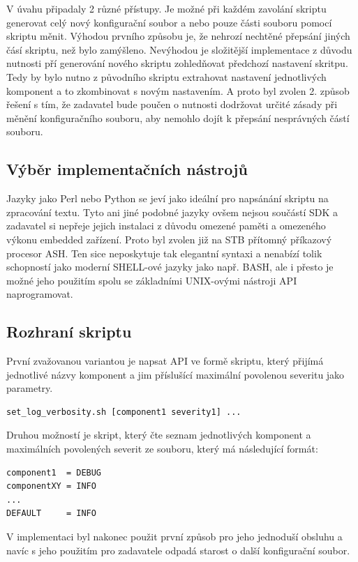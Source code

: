 \documentclass[thesis=B,czech]{FITthesis}[2012/06/26]
\begin{document}
V úvahu připadaly 2 různé přístupy. Je možné při každém zavolání skriptu generovat celý nový konfigurační soubor a nebo pouze části souboru pomocí skriptu měnit.
Výhodou prvního způsobu je, že nehrozí nechtěné přepsání jiných čásí skriptu, než bylo zamýšleno. Nevýhodou je složitější implementace z důvodu nutnosti pří generování nového skriptu zohledňovat předchozí nastavení skritpu. Tedy by bylo nutno z původního skriptu extrahovat nastavení jednotlivých komponent a to zkombinovat s novým nastavením.
A proto byl zvolen 2. způsob řešení s tím, že zadavatel bude poučen o nutnosti dodržovat určité zásady při měnění konfiguračního souboru, aby nemohlo dojít k přepsání nesprávných částí souboru.

\subsection{Výběr implementačních nástrojů}
Jazyky jako Perl nebo Python se jeví jako ideální pro napsánání skriptu na zpracování textu. Tyto ani jiné podobné jazyky ovšem nejsou součástí SDK a zadavatel si nepřeje jejich instalaci z důvodu omezené paměti a omezeného výkonu embedded zařízení. Proto byl zvolen již na STB přítomný příkazový procesor ASH. Ten sice neposkytuje tak elegantní syntaxi a nenabízí tolik schopností jako moderní SHELL-ové jazyky jako např. BASH, ale i přesto je možné jeho použitím spolu se základními UNIX-ovými nástroji API naprogramovat.

\subsection{Rozhraní skriptu}
První zvažovanou variantou je napsat API ve formě skriptu, který přijímá jednotlivé názvy komponent a jim příslušící maximální povolenou severitu jako parametry.

\begin{lstlisting}[style=RainerScriptSimpleStyle]
set_log_verbosity.sh [component1 severity1] ...
\end{lstlisting}
Druhou možností je skript, který čte seznam jednotlivých komponent a maximálních povolených severit ze souboru, který má následující formát:

\begin{lstlisting}[style=RainerScriptSimpleStyle]
component1  = DEBUG
componentXY = INFO
...
DEFAULT     = INFO
\end{lstlisting}
V implementaci byl nakonec použit první způsob pro jeho jednoduší obsluhu a navíc s jeho použitím pro zadavatele odpadá starost o další konfigurační soubor.
\end{document}
